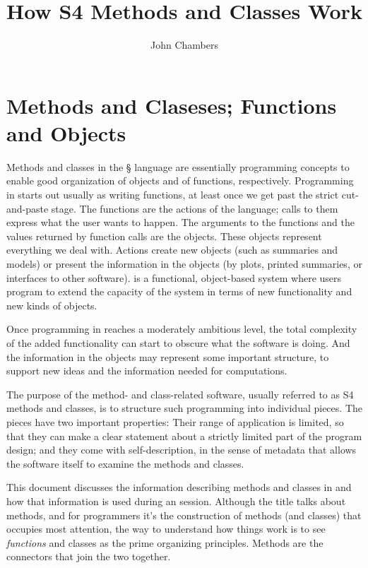 \documentclass[11pt]{article}
\title{How S4 Methods and Classes Work}
\author{John Chambers}
\newif\ifpdf
\begin{document}
\ifpdf
\DeclareGraphicsExtensions{.pdf, .jpg, .tif}
\else
{}
\fi

\maketitle

\section{Methods and Claseses; Functions and Objects}
\label{sec:meth-clas-funct}

Methods and classes in the \S{} language are essentially programming concepts to enable good organization of objects and of functions, respectively.
Programming in \R{} starts out usually as writing functions, at least once we get past the strict cut-and-paste stage.
The functions are the actions of the language; calls to them express what the user wants to happen.
The arguments to the functions and the values returned by function calls are the objects.
These objects represent everything we deal with.
Actions create new objects (such as summaries and models) or present the information in the objects (by plots, printed summaries, or interfaces to other software).
\R{} is a functional, object-based system where users program to extend the capacity of the system in terms of new functionality and new kinds of objects.

Once programming in \R{} reaches a moderately ambitious level, the total complexity of the added functionality can start to obscure what the software is doing.
And the information in the objects may represent some important structure, to support new ideas and the information needed for computations.

The purpose of the method- and class-related software, usually referred to as S4 methods and classes, is to structure such programming into individual pieces.
The pieces have two important properties:  Their range of application is limited, so that they can make a clear statement about a strictly limited part of the program design; and they come with self-description, in the sense of metadata that allows the software itself to examine the methods and classes.

This document discusses the information describing methods and classes in \R{} and how that information is used during an \R{} session.
Although the title talks about methods, and for programmers it's the construction of methods (and classes) that occupies most attention, the way to understand how things work is to see \emph{functions} and classes as the prime organizing principles.
Methods are the connectors that join the two together.
\end{document}
